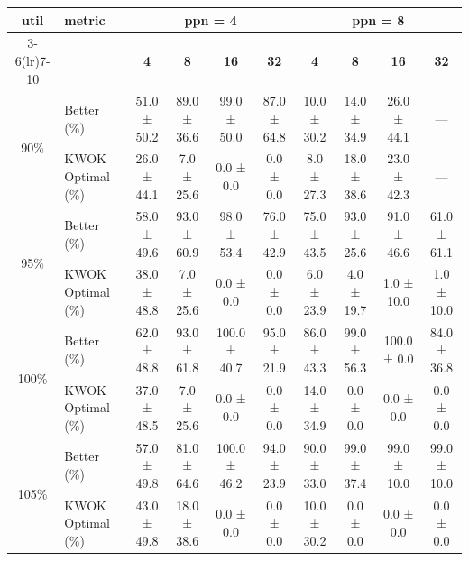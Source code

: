 \begin{tabular}{@{}c l *{8}{c}@{}}
\toprule
\multirow{2}{*}{\textbf{util}} & \multirow{2}{*}{\textbf{metric}} &\multicolumn{4}{c}{\textbf{ppn = 4}} & \multicolumn{4}{c}{\textbf{ppn = 8}}\\
\cmidrule(lr){3-6}\cmidrule(lr){7-10}
 &  & \textbf{4} & \textbf{8} & \textbf{16} & \textbf{32} & \textbf{4} & \textbf{8} & \textbf{16} & \textbf{32}\\
\midrule
\multirow{2}{*}{90\%}
& Better\,(\%) & 51.0 ± 50.2 & 89.0 ± 36.6 & 99.0 ± 50.0 & 87.0 ± 64.8 & 10.0 ± 30.2 & 14.0 ± 34.9 & 26.0 ± 44.1 & \multicolumn{1}{c}{—} \\
& KWOK\,Optimal\,(\%) & 26.0 ± 44.1 & 7.0 ± 25.6 & 0.0 ± 0.0 & 0.0 ± 0.0 & 8.0 ± 27.3 & 18.0 ± 38.6 & 23.0 ± 42.3 & \multicolumn{1}{c}{—} \\
\midrule
\multirow{2}{*}{95\%}
& Better\,(\%) & 58.0 ± 49.6 & 93.0 ± 60.9 & 98.0 ± 53.4 & 76.0 ± 42.9 & 75.0 ± 43.5 & 93.0 ± 25.6 & 91.0 ± 46.6 & 61.0 ± 61.1 \\
& KWOK\,Optimal\,(\%) & 38.0 ± 48.8 & 7.0 ± 25.6 & 0.0 ± 0.0 & 0.0 ± 0.0 & 6.0 ± 23.9 & 4.0 ± 19.7 & 1.0 ± 10.0 & 1.0 ± 10.0 \\
\midrule
\multirow{2}{*}{100\%}
& Better\,(\%) & 62.0 ± 48.8 & 93.0 ± 61.8 & 100.0 ± 40.7 & 95.0 ± 21.9 & 86.0 ± 43.3 & 99.0 ± 56.3 & 100.0 ± 0.0 & 84.0 ± 36.8 \\
& KWOK\,Optimal\,(\%) & 37.0 ± 48.5 & 7.0 ± 25.6 & 0.0 ± 0.0 & 0.0 ± 0.0 & 14.0 ± 34.9 & 0.0 ± 0.0 & 0.0 ± 0.0 & 0.0 ± 0.0 \\
\midrule
\multirow{2}{*}{105\%}
& Better\,(\%) & 57.0 ± 49.8 & 81.0 ± 64.6 & 100.0 ± 46.2 & 94.0 ± 23.9 & 90.0 ± 33.0 & 99.0 ± 37.4 & 99.0 ± 10.0 & 99.0 ± 10.0 \\
& KWOK\,Optimal\,(\%) & 43.0 ± 49.8 & 18.0 ± 38.6 & 0.0 ± 0.0 & 0.0 ± 0.0 & 10.0 ± 30.2 & 0.0 ± 0.0 & 0.0 ± 0.0 & 0.0 ± 0.0 \\
\bottomrule
\end{tabular}
